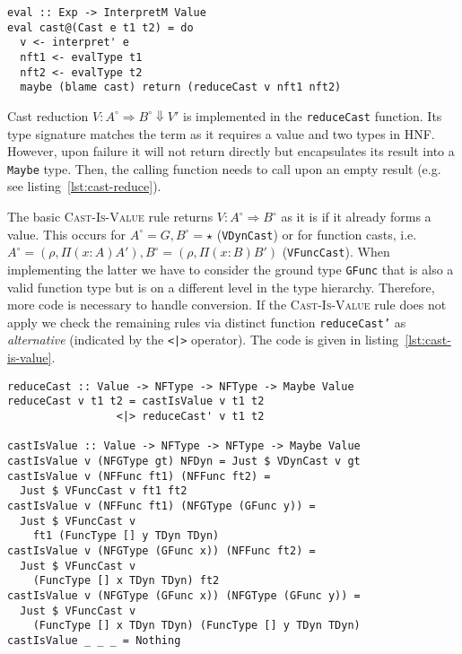 \begin{lstlisting}[float,
  caption=Haskell: Cast expression evaluation (\texttt{Interpreter.hs}),
  label=lst:cast-reduce]
eval :: Exp -> InterpretM Value
eval cast@(Cast e t1 t2) = do
  v <- interpret' e
  nft1 <- evalType t1
  nft2 <- evalType t2
  maybe (blame cast) return (reduceCast v nft1 nft2)
\end{lstlisting}

Cast reduction $V : A^\circ \Rightarrow B^\circ \Downarrow V'$ is implemented in the \texttt{reduceCast} function. Its type signature matches the term as it requires a value and two types in HNF. However, upon failure it will not return \blame directly but encapsulates its result into a \texttt{Maybe} type. Then, the calling function needs to call \blame upon an empty result (e.g. see listing~\ref{lst:cast-reduce}).

The basic \textsc{Cast-Is-Value} rule returns $V : A^\circ \Rightarrow B^\circ$ as it is if it already forms a value. This occurs for $A^\circ = G, B^\circ = \star$ (\texttt{VDynCast}) or for function casts, i.e. $A^\circ=(\rho, \Pi(x:A)A'), B^\circ=(\rho, \Pi(x:B)B')$ (\texttt{VFuncCast}). When implementing the latter we have to consider the ground type \texttt{GFunc} that is also a valid function type but is on a different level in the type hierarchy. Therefore, more code is necessary to handle conversion. If the \textsc{Cast-Is-Value} rule does not apply we check the remaining rules via distinct function \texttt{reduceCast'} as \emph{alternative} (indicated by the \texttt{<|>} operator). The code is given in listing~\ref{lst:cast-is-value}.

\begin{lstlisting}[float,
  caption=Haskell: Rule \textsc{Cast-Is-Value} (\texttt{Interpreter.hs}),
  label=lst:cast-is-value]
reduceCast :: Value -> NFType -> NFType -> Maybe Value
reduceCast v t1 t2 = castIsValue v t1 t2
                 <|> reduceCast' v t1 t2

castIsValue :: Value -> NFType -> NFType -> Maybe Value
castIsValue v (NFGType gt) NFDyn = Just $ VDynCast v gt
castIsValue v (NFFunc ft1) (NFFunc ft2) =
  Just $ VFuncCast v ft1 ft2
castIsValue v (NFFunc ft1) (NFGType (GFunc y)) =
  Just $ VFuncCast v
    ft1 (FuncType [] y TDyn TDyn)
castIsValue v (NFGType (GFunc x)) (NFFunc ft2) =
  Just $ VFuncCast v
    (FuncType [] x TDyn TDyn) ft2
castIsValue v (NFGType (GFunc x)) (NFGType (GFunc y)) =
  Just $ VFuncCast v
    (FuncType [] x TDyn TDyn) (FuncType [] y TDyn TDyn)
castIsValue _ _ _ = Nothing
\end{lstlisting}

